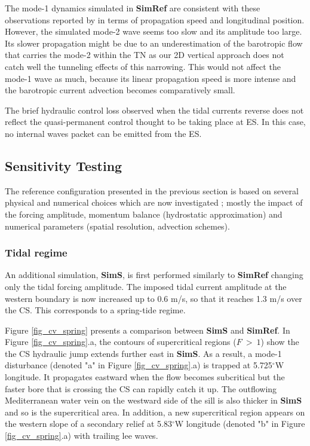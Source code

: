 The mode-1 dynamics simulated in \textbf{SimRef} are consistent with these observations reported by \citet{FA1988} in terms of propagation speed and longitudinal position. However, the simulated mode-2 wave seems too slow and its amplitude too large. Its slower propagation might be due to an underestimation of the barotropic flow that carries the mode-2 within the TN as our 2D vertical approach does not catch well the tunneling effects of this narrowing. This would not affect the mode-1 wave as much, because its linear propagation speed is more intense and the barotropic current advection becomes comparatively small.

The brief hydraulic control loss observed when the tidal currents reverse does not reflect the quasi-permanent control thought to be taking place at ES. In this case, no internal waves packet can be emitted from the ES.


\subsection{Sensitivity Testing}

The reference configuration presented in the previous section is based on several physical and numerical choices which are now investigated ; mostly the impact of the forcing amplitude, momentum balance (hydrostatic approximation) and numerical parameters (spatial resolution, advection schemes). 

\subsubsection{Tidal regime}
\label{TestAmp}

An additional simulation, \textbf{SimS}, is first performed similarly to \textbf{SimRef} changing only the tidal forcing amplitude. The imposed tidal current amplitude at the western boundary is now increased up to 0.6 m/s, so that it reaches 1.3 m/s over the CS. This corresponds to a spring-tide regime.

Figure \ref{fig_cv_spring} presents a comparison between \textbf{SimS} and \textbf{SimRef}. In Figure \ref{fig_cv_spring}.a, the contours of supercritical regions ($F\ >\ 1$) show the the CS hydraulic jump extends further east in \textbf{SimS}. As a result, a mode-1 disturbance (denoted "a" in Figure \ref{fig_cv_spring}.a) is trapped at 5.725$^\circ$W longitude. It propagates eastward when the flow becomes subcritical but the faster bore that is crossing the CS can rapidly catch it up. The outflowing Mediterranean water vein on the westward side of the sill is also thicker in \textbf{SimS} and so is the supercritical area. In addition, a new supercritical region appears on the western slope of a secondary relief at 5.83$^\circ$W longitude (denoted "b" in Figure \ref{fig_cv_spring}.a) with trailing lee waves.

